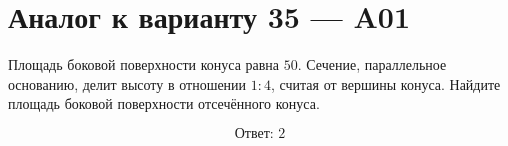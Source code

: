 \documentclass[12pt,a4paper]{article}
\begin{document}
\section*{Аналог к варианту 35 — A01}

Площадь боковой поверхности конуса равна \(50\). Сечение, параллельное основанию, делит высоту в отношении \(1:4\), считая от вершины конуса. Найдите площадь боковой поверхности отсечённого конуса.

\begin{center}
\end{center}

\[
\boxed{\text{Ответ: }2}
\]
\end{document}
